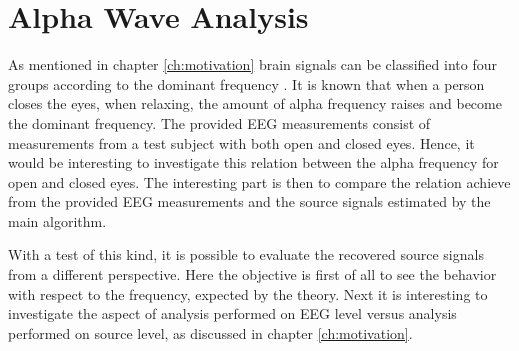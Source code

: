 \section{Alpha Wave Analysis}\label{sec:alpha_test}
As mentioned in chapter \ref{ch:motivation} brain signals can be classified into four groups according to the dominant frequency \cite{EEGsignalprocessing}. 
It is known that when a person closes the eyes, when relaxing, the amount of alpha frequency raises and become the dominant frequency. 
The provided EEG measurements consist of measurements from a test subject with both open and closed eyes.
Hence, it would be interesting to investigate this relation between the alpha frequency for open and closed eyes. 
The interesting part is then to compare the relation achieve from the provided EEG measurements and the source signals estimated by the main algorithm.

With a test of this kind, it is possible to evaluate the recovered source signals from a different perspective. 
Here the objective is first of all to see the behavior with respect to the frequency, expected by the theory. 
Next it is interesting to investigate the aspect of analysis performed on EEG level versus analysis performed on source level, as discussed in chapter \ref{ch:motivation}.              

